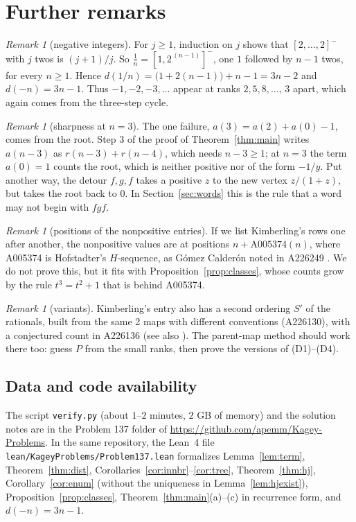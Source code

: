 \documentclass[11pt]{article}
\theoremstyle{definition}
\theoremstyle{remark}
\newtheorem{remark}[theorem]{Remark}
\newcommand{\hj}[1]{[#1]^{-}}                 %
\begin{document}
\section{Further remarks}\label{sec:remarks}

\begin{remark}[negative integers]
For $j\ge1$, induction on $j$ shows that $\hj{2,\dots,2}$ with $j$ twos is $(j+1)/j$. So
$\tfrac1n=\hj{1,2^{\,(n-1)}}$, one $1$ followed by $n-1$ twos, for every $n\ge1$. Hence
$d(1/n)=\bigl(1+2(n-1)\bigr)+n-1=3n-2$ and $d(-n)=3n-1$. Thus $-1,-2,-3,\dots$ appear at ranks
$2,5,8,\dots$, $3$ apart, which again comes from the three-step cycle.
\end{remark}

\begin{remark}[sharpness at $n=3$]\label{rem:sharp}
The one failure, $a(3)=a(2)+a(0)-1$, comes from the root. Step 3 of the proof of
Theorem~\ref{thm:main} writes $a(n-3)$ as $r(n-3)+r(n-4)$, which needs $n-3\ge1$; at $n=3$ the term
$a(0)=1$ counts the root, which is neither positive nor of the form $-1/y$. Put another way, the
detour $f,g,f$ takes a positive $z$ to the new vertex $z/(1+z)$, but takes the root back to $0$. In
Section~\ref{sec:words} this is the rule that a word may not begin with $fgf$.
\end{remark}

\begin{remark}[positions of the nonpositive entries]
If we list Kimberling's rows one after another, the nonpositive values are at positions
$n+\mathrm{A005374}(n)$, where A005374 is Hofstadter's $H$-sequence, as G\'omez Calder\'on noted in
A226249 \cite{oeisA226249}. We do not prove this, but it fits with Proposition~\ref{prop:classes},
whose counts grow by the rule $t^{3}=t^{2}+1$ that is behind A005374.
\end{remark}

\begin{remark}[variants]
Kimberling's entry also has a second ordering $S'$ of the rationals, built from the same 2 maps
with different conventions (A226130), with a conjectured count in A226136 (see also
\cite{kagey-mse}). The parent-map method should work there too: guess $P$ from the small ranks,
then prove the versions of (D1)--(D4).
\end{remark}

\subsection*{Data and code availability}
The script \texttt{verify.py} (about $1$--$2$ minutes, $2$ GB of memory) and the solution notes
are in the Problem 137 folder of \url{https://github.com/apemm/Kagey-Problems}. In the same
repository, the Lean~4 file \texttt{lean/KageyProblems/Problem137.lean} formalizes Lemma~\ref{lem:term},
Theorem~\ref{thm:dist}, Corollaries~\ref{cor:innbr}--\ref{cor:tree}, Theorem~\ref{thm:hj},
Corollary~\ref{cor:enum} (without the uniqueness in Lemma~\ref{lem:hjexist}),
Proposition~\ref{prop:classes}, Theorem~\ref{thm:main}(a)--(c) in recurrence form, and
$d(-n)=3n-1$.
\end{document}
